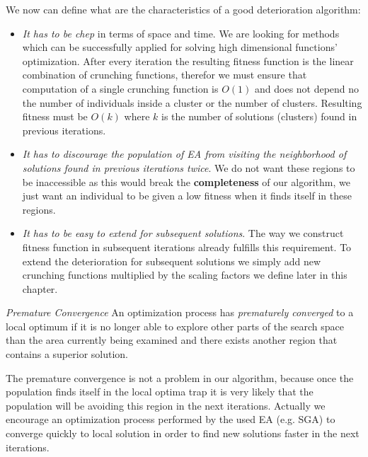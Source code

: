 We now can define what are the characteristics of a good deterioration
algorithm:
\begin{itemize}
  \item \textit{It has to be chep} in terms of space and time. We are looking
  for methods which can be successfully applied for solving high
  dimensional functions' optimization. After every iteration the resulting
  fitness function is the linear combination of crunching functions, therefor we
  must ensure that computation of a single crunching function is $O(1)$ and does 
  not depend no the number of individuals inside a cluster or the number of
  clusters. Resulting fitness must be $O(k)$ where $k$ is the number of
  solutions (clusters) found in previous iterations.
  
  \item \textit{It has to discourage the population of EA from visiting the
  neighborhood of solutions found in previous iterations twice}. We do not want
  these regions to be inaccessible as this would break the \textbf{completeness} 
  of our algorithm, we just want an individual to be given a low fitness when it
  finds itself in these regions.
  
  \item \textit{It has to be easy to extend for subsequent solutions}. The way
  we construct fitness function in subsequent iterations already fulfills
  this requirement. To extend the deterioration for subsequent solutions we
  simply add new crunching functions multiplied by the scaling factors we define
  later in this chapter. 
\end{itemize}


\begin{definition}\label{premature-convergence}
\textit{Premature Convergence} \cite{PardalosRomeijn2002} An optimization process has
\textit{prematurely converged} to a local optimum if it is no longer able to explore 
other parts of the search space than the area currently being examined and there 
exists another region that contains a superior solution.
\end{definition}

The premature convergence is not a problem in our algorithm, because once the
population finds itself in the local optima trap it is very likely that the
population will be avoiding this region in the next iterations. Actually we
encourage an optimization process performed by the used EA (e.g. SGA) 
to converge quickly to local solution in order to find new solutions 
faster in the next iterations. 

